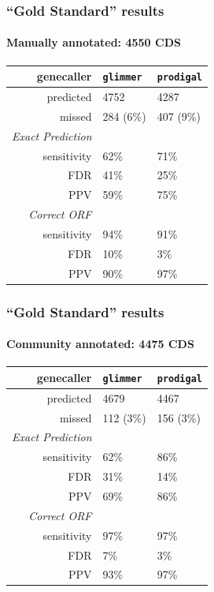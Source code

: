 \documentclass[table]{beamer}
\begin{document}
    \begin{frame}
     \frametitle{``Gold Standard'' results}
     \framesubtitle{Manually annotated: 4550 CDS}
    \begin{center}
	\begin{tabular}{r|l|l}
	  genecaller & \texttt{glimmer} & \texttt{prodigal}  \\
	  \hline
	  predicted & 4752    & 4287  \\
	  missed & 284 (6\%)   & 407 (9\%)  \\
	  \hline
	  \emph{Exact Prediction} & & \\
  	  sensitivity   & 62\%   & 71\%  \\
  	  FDR   & 41\%   & 25\%  \\  
	  PPV   & 59\% & 75\%  \\  
	  \hline
	  \emph{Correct ORF} & & \\
  	  sensitivity   & 94\%   & 91\% \\
  	  FDR   & 10\%  & 3\% \\  
	  PPV   & 90\% & 97\%  \\  
	\end{tabular}
	\end{center}     
   \end{frame}

    \begin{frame}
     \frametitle{``Gold Standard'' results}
     \framesubtitle{Community annotated: 4475 CDS}
    \begin{center}
	\begin{tabular}{r|l|l}
	  genecaller & \texttt{glimmer} & \texttt{prodigal}  \\
	  \hline
	  predicted & 4679    & 4467  \\
	  missed & 112 (3\%)   & 156 (3\%)  \\
	  \hline
	  \emph{Exact Prediction} & & \\
  	  sensitivity   & 62\%   & 86\%  \\
  	  FDR   & 31\%   & 14\%  \\  
	  PPV   & 69\% & 86\%  \\  
	  \hline
	  \emph{Correct ORF} & & \\
  	  sensitivity   & 97\%   & 97\% \\
  	  FDR   & 7\%  & 3\% \\  
	  PPV   & 93\% & 97\%  \\  
	\end{tabular}
	\end{center}     
   \end{frame}
\end{document}
